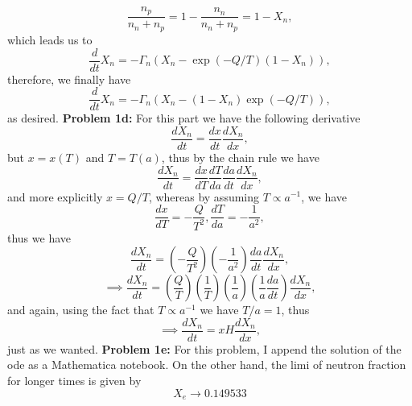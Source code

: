 \documentclass[11pt]{article}
\begin{document}
\begin{displaymath}
  \frac{n_p}{n_n +n_p} = 1 - \frac{n_n}{n_n +n_p}= 1 - X_n,
\end{displaymath}
which leads us to 
\begin{displaymath}
\frac{d}{dt} X_n = -\Gamma_n \left( X_n - \exp(-Q/T) (1 - X_n)\right),  
\end{displaymath}
therefore, we finally have
\begin{displaymath}
\frac{d}{dt} X_n = -\Gamma_n \left( X_n - (1 - X_n)\exp(-Q/T)\right),
\end{displaymath}
as desired.
\newline
\textbf{Problem 1d:}
For this part we have the following derivative
\begin{displaymath}
  \frac{dX_n}{dt}=\frac{dx}{dt}\frac{dX_n}{dx},
\end{displaymath}
but $x = x(T)$ and $T=T(a)$, thus by the chain rule we have
\begin{displaymath}
 	\frac{dX_n}{dt}=\frac{dx}{dT}\frac{dT}{da}\frac{da}{dt}\frac{dX_n}{dx},
\end{displaymath}
and more explicitly $x=Q/T$, whereas by assuming $T\propto a^{-1}$, we have
\begin{displaymath}
 	\frac{dx}{dT} = -\frac{Q}{T^2}, \frac{dT}{da}= -\frac{1}{a^2}, 
\end{displaymath}
 thus we have
\begin{displaymath}
	\frac{dX_n}{dt}=\left(-\frac{Q}{T^2}\right)\left(-\frac{1}{a^2}\right)\frac{da}{dt}\frac{dX_n}{dx},  
\end{displaymath}
\begin{displaymath}
\implies\frac{dX_n}{dt}=\left(\frac{Q}{T}\right)\left(\frac{1}{T}\right)\left(\frac{1}{a}\right)\left(\frac{1}{a}\frac{da}{dt}\right)\frac{dX_n}{dx},
\end{displaymath}
and again, using the fact that $T\propto a^{-1}$ we have $T/a = 1$, thus
\begin{displaymath}
\implies\frac{dX_n}{dt}=xH\frac{dX_n}{dx},  
\end{displaymath}
just as we wanted.
\newline
\textbf{Problem 1e:}
For this problem, I append the solution of the ode as a Mathematica notebook. On the other hand, the limi of neutron fraction for longer times is given by
\begin{displaymath}
  X_e \rightarrow 0.149533
\end{displaymath}
\end{document}
